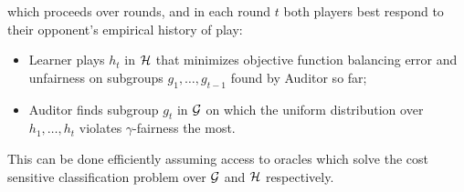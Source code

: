 which proceeds over rounds, and in each round $t$ both players best
respond to their opponent's empirical history of play:
\begin{itemize} 
\item Learner plays $h_t$ in $\mathcal{H}$ that minimizes objective function
  balancing error and unfairness on subgroups $g_1, \ldots, g_{t-1}$
  found by Auditor so far;
\item Auditor finds subgroup $g_t$ in $\mathcal{G}$ on which the uniform
  distribution over $h_1, \ldots , h_t$ violates $\gamma$-fairness the
  most.
\end{itemize}
 This can be done efficiently assuming access to oracles which solve the cost sensitive classification problem over $\mathcal{G}$ and $\mathcal{H}$ respectively.

